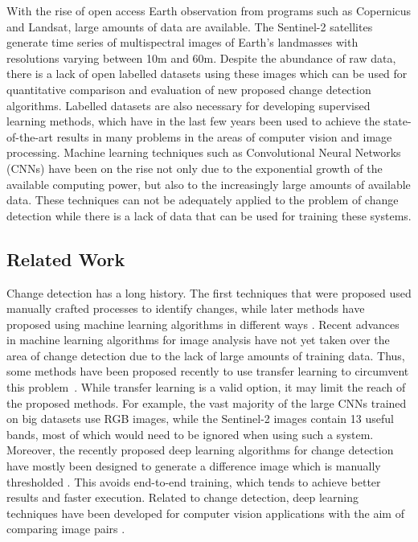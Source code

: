 \documentclass{article}
\begin{document}
With the rise of open access Earth observation from programs such as Copernicus and Landsat, large amounts of data are available. The Sentinel-2 satellites generate time series of multispectral images of Earth's landmasses with resolutions varying between 10m and 60m. Despite the abundance of raw data, there is a lack of open labelled datasets using these images which can be used for quantitative comparison and evaluation of new proposed change detection algorithms. Labelled datasets are also necessary for developing supervised learning methods, which have in the last few years been used to achieve the state-of-the-art results in many problems in the areas of computer vision and image processing. Machine learning techniques such as Convolutional Neural Networks (CNNs) have been on the rise not only due to the exponential growth of the available computing power, but also to the increasingly large amounts of available data. These techniques can not be adequately applied to the problem of change detection while there is a lack of data that can be used for training these systems.


\subsection{Related Work}
\label{ssec:rw}

Change detection has a long history. The first techniques that were proposed used manually crafted processes to identify changes, while later methods have proposed using machine learning algorithms in different ways \cite{hussain2013change,singh1989review,le2013urban,liu2016unsupervised}. Recent advances in machine learning algorithms for image analysis have not yet taken over the area of change detection due to the lack of large amounts of training data. Thus, some methods have been proposed recently to use transfer learning to circumvent this problem~\cite{el2017zoom}. While transfer learning is a valid option, it may limit the reach of the proposed methods. For example, the vast majority of the large CNNs trained on big datasets use RGB images, while the Sentinel-2 images contain 13 useful bands, most of which would need to be ignored when using such a system. Moreover, the recently proposed deep learning algorithms for change detection have mostly been designed to generate a difference image which is manually thresholded \cite{zhan2017change}. This avoids end-to-end training, which tends to achieve better results and faster execution. Related to change detection, deep learning techniques have been developed for computer vision applications with the aim of comparing image pairs \cite{zagoruyko2015learning}.
\end{document}
